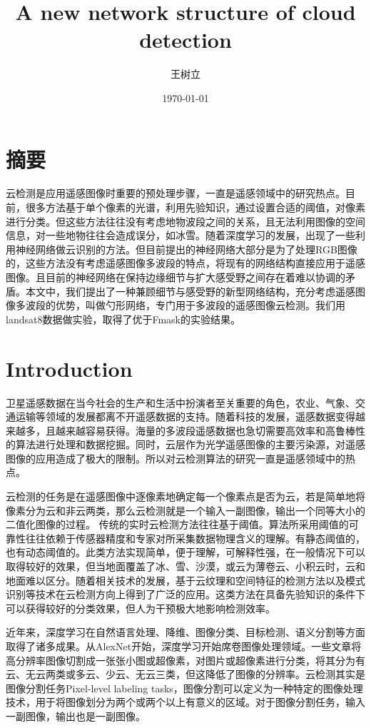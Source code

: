 \documentclass[UTF8]{ctexart}
\begin{document}
\title{A new network structure of cloud detection}
\author{王树立}
\date{\today}

\maketitle
\section*{摘要}
云检测是应用遥感图像时重要的预处理步骤，一直是遥感领域中的研究热点。目前，很多方法基于单个像素的光谱，利用先验知识，通过设置合适的阈值，对像素进行分类。但这些方法往往没有考虑地物波段之间的关系，且无法利用图像的空间信息，对一些地物往往会造成误分，如冰雪。随着深度学习的发展，出现了一些利用神经网络做云识别的方法。但目前提出的神经网络大部分是为了处理RGB图像的，这些方法没有考虑遥感图像多波段的特点，将现有的网络结构直接应用于遥感图像。且目前的神经网络在保持边缘细节与扩大感受野之间存在着难以协调的矛盾。本文中，我们提出了一种兼顾细节与感受野的新型网络结构，充分考虑遥感图像多波段的优势，叫做勺形网络，专门用于多波段的遥感图像云检测。我们用landsat8数据做实验，取得了优于Fmask的实验结果。

\section[]{Introduction}
卫星遥感数据在当今社会的生产和生活中扮演者至关重要的角色，农业、气象、交通运输等领域的发展都离不开遥感数据的支持。随着科技的发展，遥感数据变得越来越多，且越来越容易获得。海量的多波段遥感数据也急切需要高效率和高鲁棒性的算法进行处理和数据挖掘。同时，云层作为光学遥感图像的主要污染源，对遥感图像的应用造成了极大的限制。所以对云检测算法的研究一直是遥感领域中的热点。

云检测的任务是在遥感图像中逐像素地确定每一个像素点是否为云，若是简单地将像素分为云和非云两类，那么云检测就是一个输入一副图像，输出一个同等大小的二值化图像的过程。
传统的实时云检测方法往往基于阈值。算法所采用阈值的可靠性往往依赖于传感器精度和专家对所采集数据物理含义的理解。有静态阈值的，也有动态阈值的。此类方法实现简单，便于理解，可解释性强，在一般情况下可以取得较好的效果，但当地面覆盖了冰、雪、沙漠，或云为薄卷云、小积云时，云和地面难以区分。随着相关技术的发展，基于云纹理和空间特征的检测方法以及模式识别等技术在云检测方向上得到了广泛的应用。这类方法在具备先验知识的条件下可以获得较好的分类效果，但人为干预极大地影响检测效率。

近年来，深度学习在自然语言处理、降维、图像分类、目标检测、语义分割等方面取得了诸多成果。从AlexNet开始，深度学习开始席卷图像处理领域。一些文章将高分辨率图像切割成一张张小图或超像素，对图片或超像素进行分类，将其分为有云、无云两类或多云、少云、无云三类，但这降低了图像的分辨率。云检测其实是图像分割任务Pixel-level labeling tasks，图像分割可以定义为一种特定的图像处理技术，用于将图像划分为两个或两个以上有意义的区域。对于图像分割任务，输入一副图像，输出也是一副图像。
\end{document}
